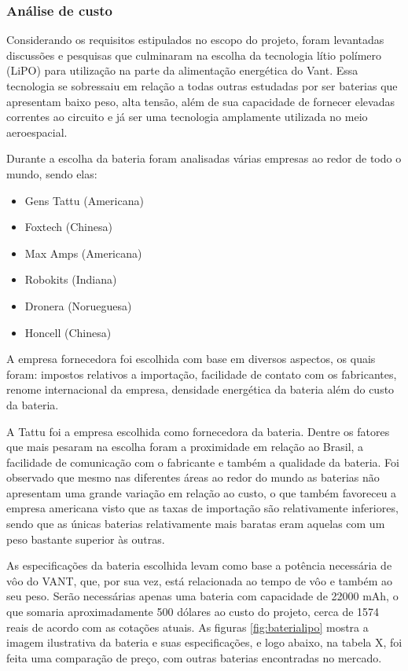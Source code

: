 \subsubsection{Análise de custo}
Considerando os requisitos estipulados no escopo do projeto, foram levantadas discussões e pesquisas que culminaram na escolha da tecnologia lítio polímero (LiPO) para utilização na parte da alimentação energética do Vant. Essa tecnologia se sobressaiu em relação a todas outras estudadas por ser baterias que apresentam baixo peso, alta tensão, além de sua capacidade de fornecer elevadas correntes ao circuito e já ser uma tecnologia amplamente utilizada no meio aeroespacial.

Durante a escolha da bateria foram analisadas várias empresas ao redor de todo o mundo, sendo elas:

\begin{itemize}
 
\item Gens Tattu (Americana)

\item Foxtech (Chinesa)

\item Max Amps (Americana)

\item Robokits (Indiana)

\item Dronera (Norueguesa)

\item Honcell (Chinesa)

\end{itemize}

A empresa fornecedora foi escolhida com base em diversos aspectos, os quais foram: impostos relativos a importação, facilidade de contato com os fabricantes, renome internacional da empresa, densidade energética da bateria além do custo da bateria.

A  Tattu foi a empresa escolhida como fornecedora da bateria.  Dentre os fatores que mais pesaram na escolha foram a proximidade em relação ao Brasil, a facilidade de comunicação com o fabricante e também a qualidade da bateria. Foi observado que mesmo nas diferentes áreas ao redor do mundo as baterias não apresentam uma grande variação em relação ao custo, o que também favoreceu a empresa americana visto que as taxas de importação são relativamente inferiores, sendo que as únicas baterias relativamente mais baratas eram aquelas com um peso bastante superior às outras.

As especificações da bateria escolhida levam como base a potência necessária de vôo do VANT, que, por sua vez, está relacionada ao tempo de vôo e também ao seu peso.  Serão necessárias apenas uma bateria com capacidade de 22000 mAh, o que somaria aproximadamente 500 dólares ao custo do projeto, cerca de 1574 reais de acordo com as cotações atuais. As figuras \ref{fig:baterialipo} mostra a imagem ilustrativa da bateria e suas especificações, e logo abaixo, na tabela X, foi feita uma comparação de preço, com outras baterias encontradas no mercado.

